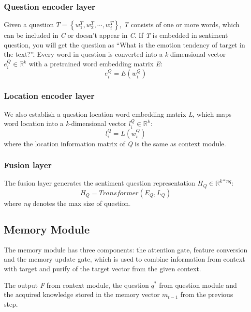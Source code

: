 \documentclass[runningheads, twocolumn]{llncs}
\begin{document}
\subsubsection{Question encoder layer}
Given a question $T = \left\{w_1^T, w_2^T, \cdots, w_i^T\right\}$,  \emph{T} consists of one or more words, which can be included in \emph{C} or doesn’t appear in \emph{C}. If \emph{T} is embedded in sentiment question, you will get the question as “What is the emotion tendency of target in the text?”. Every word in question is converted into a \emph{k}-dimensional vector $e_i^Q \in \mathbb{R}^k$ with a pretrained word embedding matrix \emph{E}:
\begin{equation}
	e_i^Q = E(w_i^Q)
\end{equation}

\subsubsection{Location encoder layer}
We also establish a question location word embedding matrix \emph{L}, which maps word location into a \emph{k}-dimensional vector $l_i^Q \in \mathbb{R}^k$:
\begin{equation}
	l_i^Q = L\left(w_i^Q\right)
\end{equation}
where the location information matrix of \emph{Q} is the same as context module.

\subsubsection{Fusion layer}
The fusion layer generates the sentiment question representation $H_Q \in \mathbb{R}^{k\ast nq}$:
\begin{equation}
	H_Q = Transformer\left(E_Q, L_Q\right)\label{H_Q}
\end{equation}
where \emph{nq} denotes the max size of question.

\subsection{Memory Module}
The memory module has three components: the attention gate, feature conversion and the memory update gate, which is used to combine information from context with target and purify of the target vector from the given context.

The output \emph{F} from context module, the question $q^\ast$ from question module and the acquired knowledge stored in the memory vector $m_{t-1}$ from the previous step.
\end{document}
